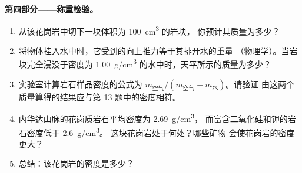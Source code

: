\begin{problem}
\medskip
\noindent\textbf{第四部分——称重检验。}
\begin{enumerate}[resume]
  \item 从该花岗岩中切下一块体积为 \qty{100}{cm^3} 的岩块，
        你预计其质量为多少？
  \item 将物体挂入水中时，它受到的向上推力等于其排开水的重量
        （物理学）。当岩块完全浸没于密度为
        \qty{1.00}{g/cm^3} 的水中时，天平所示的质量为多少？
  \item 实验室计算岩石样品密度的公式为
        $m_{\text{空气}}/(m_{\text{空气}} - m_{\text{水}})$。请验证
        由这两个质量算得的结果应与第 13 题中的密度相符。
  \item 内华达山脉的花岗质岩石平均密度为 \qty{2.69}{g/cm^3}，
        而富含二氧化硅和钾的岩石密度低于 \qty{2.6}{g/cm^3}。
        这块花岗岩处于何处？哪些矿物
        会使花岗岩的密度更大？
  \item 总结：该花岗岩的密度是多少？
\end{enumerate}
\end{problem}
